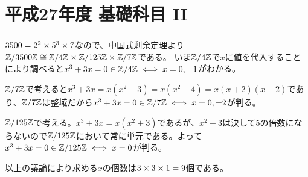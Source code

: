 \section{平成27年度 基礎科目 II}

\setcounter{subsubsection}{3}
\subsubsection{} %
\begin{sol}
$3500 = 2^2 \times 5^3 \times 7$なので、中国式剰余定理より${\mathbb Z} / 3500 {\mathbb Z} \cong {\mathbb Z} / 4{\mathbb Z} \times {\mathbb Z} / 125 {\mathbb Z} \times {\mathbb Z} / 7{\mathbb Z}$である。
いま${\mathbb Z} / 4{\mathbb Z}$で$x$に値を代入することにより調べると$x^3 + 3x = 0 \in {\mathbb Z} / 4 {\mathbb Z} \iff x = 0, \pm 1$がわかる。

${\mathbb Z} / 7 {\mathbb Z}$で考えると$x^3 + 3x = x(x^2 + 3) = x(x^2 - 4)= x(x+2)(x-2)$であり、${\mathbb Z} / 7 {\mathbb Z}$は整域だから$x^3 + 3x = 0 \in {\mathbb Z} / 7 {\mathbb Z} \iff x = 0, \pm 2$が判る。

${\mathbb Z} / 125 {\mathbb Z}$で考える。$x^3 + 3x = x(x^2 + 3)$であるが、$x^2 + 3$は決して$5$の倍数にならないので${\mathbb Z} / 125 {\mathbb Z}$において常に単元である。よって$x^3 + 3x = 0 \in {\mathbb Z} / 125 {\mathbb Z} \iff x = 0$が判る。

以上の議論により求める$x$の個数は$3 \times 3 \times 1 = 9$個である。
\end{sol}

\newpage

\setcounter{subsubsection}{6}
\subsubsection{} %
